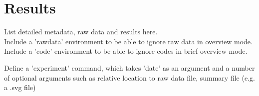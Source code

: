 \chapter{Results}
List detailed metadata, raw data and results here.\\
Include a 'rawdata' environment to be able to ignore raw data in overview mode.
Include a 'code' environment to be able to ignore codes in brief overview mode.


Define a 'experiment' command, which takes 'date' as an argument and a number of optional arguments such as relative location to raw data file, summary file (e.g. a .svg file) 

\iffalse

It will be like this:
\experiment{20201031}[<name or path-to-summary.xlsx>]

    \rawdata
    this will add rawdata, in csv. form, here

    \code
    this will add codes for this analysis here.

\fi
